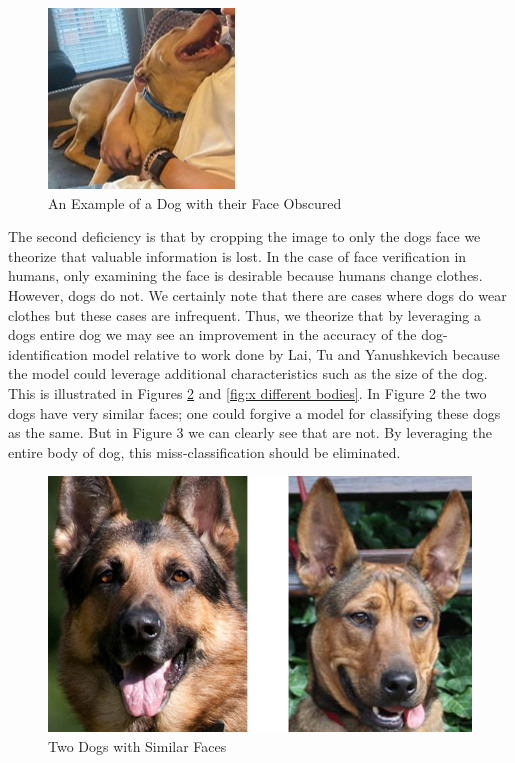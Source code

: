 \documentclass{article}
\begin{document}
\begin{figure}[h]
\centering
	\includegraphics{final-report-images/nofacedog.jpg}
\caption{An Example of a Dog with their Face Obscured}
\label{fig:x dog no face}
\end{figure}
The second deficiency is that by cropping the image to only the dogs face we theorize that valuable information is lost.  In the case of face verification in humans, only examining the face is desirable because humans change clothes.  However, dogs do not.  We certainly note that there are cases where dogs do wear clothes but these cases are infrequent.  Thus, we theorize that by leveraging a dogs entire dog we may see an improvement in the accuracy of the dog-identification model relative to work done by  Lai, Tu and Yanushkevich because the model could leverage additional characteristics such as the size of the dog.  This is illustrated in Figures \ref{fig:x similar faces} and \ref{fig:x different bodies}.  In Figure 2 the two dogs have very similar faces; one could forgive a model for classifying these dogs as the same.  But in Figure 3 we can clearly see that are not.  By leveraging the entire body of dog, this miss-classification should be eliminated.

\begin{figure}[h]
\centering
	\includegraphics{final-report-images/similar_faces.png}
\caption{Two Dogs with Similar Faces}
\label{fig:x similar faces}
\end{figure}
\end{document}
